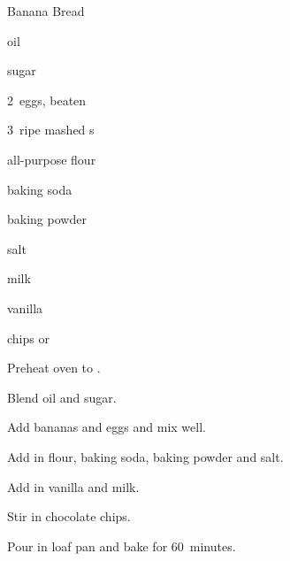 \begin{recipe}{Banana Bread}{}{}

\begin{ingredients}
\item \C{\half} oil
\item {} sugar
\item 2~eggs, beaten
\item 3~ripe mashed s
\item {} all-purpose flour
\item {} baking soda
\item \tp{\half} baking powder
\item \tp{\half} salt
\item {} milk
\item \tp{\half} vanilla
\item {}  chips or 
\end{ingredients}

\begin{directions}
\item Preheat oven to .
\item Blend oil and sugar.
\item Add bananas and eggs and mix well.
\item Add in flour, baking soda, baking powder and salt.
\item Add in vanilla and milk.
\item Stir in chocolate chips.
\item Pour in loaf pan and bake for 60~minutes.
\end{directions}

\end{recipe}

